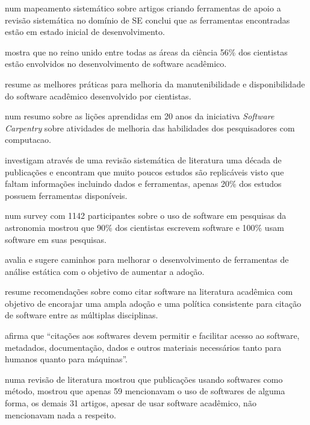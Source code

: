 num mapeamento sistemático sobre artigos criando
ferramentas de apoio a revisão sistemática no domínio de SE conclui que as
ferramentas encontradas estão em estado inicial de desenvolvimento.

 mostra que no reino unido entre todas as áreas da
ciência 56\% dos cientistas estão envolvidos no desenvolvimento de software
acadêmico.

 resume as melhores práticas para melhoria da
manutenibilidade e disponibilidade do software acadêmico desenvolvido por
cientistas.

 num resumo sobre as lições aprendidas em 20
anos da iniciativa {\it Software Carpentry} sobre atividades de melhoria das
habilidades dos pesquisadores com computacao.

investigam através de uma revisão sistemática de literatura uma década de
publicações e encontram que muito poucos estudos são replicáveis visto que
faltam informações incluindo dados e ferramentas, apenas 20\% dos estudos
possuem ferramentas disponíveis.

num survey com 1142 participantes sobre o uso de software em pesquisas da
astronomia mostrou que 90\% dos cientistas escrevem software e 100\% usam
software em suas pesquisas.

 avalia e sugere caminhos para melhorar o
desenvolvimento de ferramentas de análise estática com o objetivo de aumentar a
adoção.

 resume recomendações sobre como citar software
na literatura acadêmica com objetivo de encorajar uma ampla adoção e uma
política consistente para citação de software entre as múltiplas disciplinas.

 afirma que ``citações aos softwares devem
permitir e facilitar acesso ao software, metadados, documentação, dados e
outros materiais necessários tanto para humanos quanto para máquinas''.


numa revisão de literatura mostrou que publicações usando softwares como
método, mostrou que apenas 59 mencionavam o uso de softwares de alguma forma,
os demais 31 artigos, apesar de usar software acadêmico, não mencionavam nada a
respeito.

